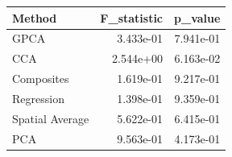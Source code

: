 \begin{tabular}{lrr}
\toprule
Method & F_statistic & p_value \\
\midrule
GPCA & 3.433e-01 & 7.941e-01 \\
CCA & 2.544e+00 & 6.163e-02 \\
Composites & 1.619e-01 & 9.217e-01 \\
Regression & 1.398e-01 & 9.359e-01 \\
Spatial Average & 5.622e-01 & 6.415e-01 \\
PCA & 9.563e-01 & 4.173e-01 \\
\bottomrule
\end{tabular}
